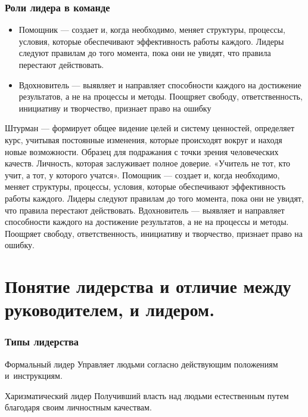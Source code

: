 \documentclass{../industrial-development}
\begin{document}
\begin{frame} \frametitle{Роли лидера в команде}
\begin{itemize}
\item Помощник — создает и, когда необходимо, меняет структуры, процессы, условия, которые обеспечивают эффективность работы каждого. Лидеры следуют правилам до того момента, пока они не увидят, что правила перестают действовать.

\item Вдохновитель — выявляет и направляет способности каждого на достижение результатов, а не на процессы и методы. Поощряет свободу, ответственность, инициативу и творчество, признает право на ошибку
  \end{itemize}
\end{frame}

\lecturenotes
Штурман — формирует общее видение целей и систему ценностей, определяет курс, учитывая постоянные изменения, которые происходят вокруг и находя новые возможности.
Образец для подражания с точки зрения человеческих качеств. Личность, которая заслуживает полное доверие. «Учитель не тот, кто учит, а тот, у которого учатся».
Помощник — создает и, когда необходимо, меняет структуры, процессы, условия, которые обеспечивают эффективность работы каждого. Лидеры следуют правилам до того момента, пока они не увидят, что правила перестают действовать.
Вдохновитель — выявляет и направляет способности каждого на достижение результатов, а не на процессы и методы. Поощряет свободу, ответственность, инициативу и творчество, признает право на ошибку.

\section{Понятие лидерства и отличие между руководителем, и лидером.}

\begin{frame} \frametitle{Типы лидерства}
 	  \begin{block}{Формальный лидер}
           Управляет людьми согласно действующим положениям и~инструкциям.
	  \end{block}

	  \begin{block}{Харизматический лидер}
          Получивший власть над людьми естественным путем благодаря своим личностным качествам.
	  \end{block}
\end{frame}

\lecturenotes
\end{document}

